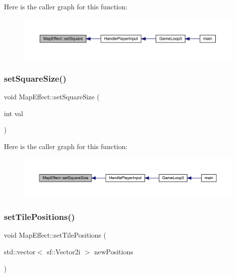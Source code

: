 Here is the caller graph for this function\+:\nopagebreak
\begin{figure}[H]
\begin{center}
\leavevmode
\includegraphics[width=350pt]{de/de4/class_map_effect_a4c382be68e0b9dae8fb1f216c8cfc9a6_icgraph}
\end{center}
\end{figure}
\mbox{\label{class_map_effect_adfa0231021b37a4fe775f33330454cb2}} 
\subsubsection{\texorpdfstring{set\+Square\+Size()}{setSquareSize()}}
{\footnotesize\ttfamily void Map\+Effect\+::set\+Square\+Size (\begin{DoxyParamCaption}\item[{int}]{val }\end{DoxyParamCaption})}

Here is the caller graph for this function\+:\nopagebreak
\begin{figure}[H]
\begin{center}
\leavevmode
\includegraphics[width=350pt]{de/de4/class_map_effect_adfa0231021b37a4fe775f33330454cb2_icgraph}
\end{center}
\end{figure}
\mbox{\label{class_map_effect_af79dd085aefbd1cdd92e9e9aa695592a}} 
\subsubsection{\texorpdfstring{set\+Tile\+Positions()}{setTilePositions()}}
{\footnotesize\ttfamily void Map\+Effect\+::set\+Tile\+Positions (\begin{DoxyParamCaption}\item[{std\+::vector$<$ sf\+::\+Vector2i $>$}]{new\+Positions }\end{DoxyParamCaption})}



